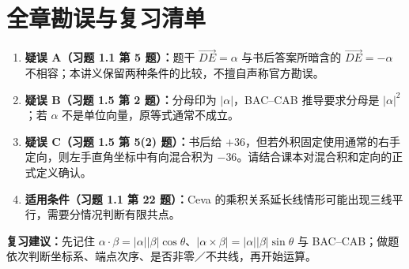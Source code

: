 \documentclass[UTF8,a4paper,11pt,fontset=none]{ctexart}
\newcommand{\V}[1]{\overrightarrow{#1}}
\newcommand{\tip}[1]{\begin{tcolorbox}[colback=light,colframe=rulegray,boxrule=0.4pt,arc=1.5mm,left=3mm,right=3mm,top=2mm,bottom=2mm]#1\end{tcolorbox}}
\begin{document}
\section*{全章勘误与复习清单}
\begin{enumerate}
\item \textbf{疑误 A（习题 1.1 第 5 题）：}题干 $\V{DE}=\alpha$ 与书后答案所暗含的 $\V{DE}=-\alpha$ 不相容；本讲义保留两种条件的比较，不擅自声称官方勘误。
\item \textbf{疑误 B（习题 1.5 第 2 题）：}分母印为 $|\alpha|$，BAC--CAB 推导要求分母是 $|\alpha|^2$；若 $\alpha$ 不是单位向量，原等式通常不成立。
\item \textbf{疑误 C（习题 1.5 第 5(2) 题）：}书后给 $+36$，但若外积固定使用通常的右手定向，则左手直角坐标中有向混合积为 $-36$。请结合课本对混合积和定向的正式定义确认。
\item \textbf{适用条件（习题 1.1 第 22 题）：}Ceva 的乘积关系延长线情形可能出现三线平行，需要分情况判断有限共点。
\end{enumerate}
\tip{\textbf{复习建议：}先记住 $\alpha\cdot\beta=|\alpha||\beta|\cos\theta$、$|\alpha\times\beta|=|\alpha||\beta|\sin\theta$ 与 BAC--CAB；做题依次判断坐标系、端点次序、是否非零／不共线，再开始运算。}
\vspace{3mm}
\end{document}
